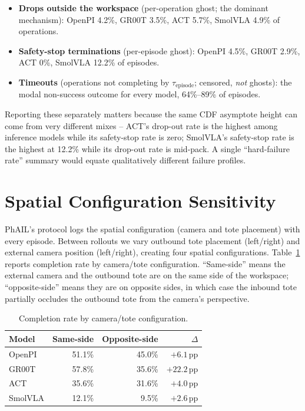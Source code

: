 \documentclass{article}
\begin{document}
\begin{itemize}
  \item \textbf{Drops outside the workspace} (per-operation ghost; the dominant mechanism): OpenPI 4.2\%, GR00T 3.5\%, ACT 5.7\%, SmolVLA 4.9\% of operations.
  \item \textbf{Safety-stop terminations} (per-episode ghost): OpenPI 4.5\%, GR00T 2.9\%, ACT 0\%, SmolVLA 12.2\% of episodes.
  \item \textbf{Timeouts} (operations not completing by $\tau_\text{episode}$; censored, \emph{not} ghosts): the modal non-success outcome for every model, 64\%--89\% of episodes.
\end{itemize}

Reporting these separately matters because the same CDF asymptote height can come from very different mixes -- ACT's drop-out rate is the highest among inference models while its safety-stop rate is zero; SmolVLA's safety-stop rate is the highest at 12.2\% while its drop-out rate is mid-pack. A single ``hard-failure rate'' summary would equate qualitatively different failure profiles.

\section{Spatial Configuration Sensitivity}\label{app:spatial}

PhAIL's protocol logs the spatial configuration (camera and tote placement) with every episode. Between rollouts we vary outbound tote placement (left/right) and external camera position (left/right), creating four spatial configurations. Table~\ref{tab:spatial} reports completion rate by camera/tote configuration. ``Same-side'' means the external camera and the outbound tote are on the same side of the workspace; ``opposite-side'' means they are on opposite sides, in which case the inbound tote partially occludes the outbound tote from the camera's perspective.

\begin{table}[!h]
\centering
\begin{tabular}{lrrr}
\toprule
Model & Same-side & Opposite-side & $\Delta$ \\
\midrule
OpenPI  & 51.1\% & 45.0\% & $+6.1$\,pp  \\
GR00T   & 57.8\% & 35.6\% & $+22.2$\,pp \\
ACT     & 35.6\% & 31.6\% & $+4.0$\,pp  \\
SmolVLA & 12.1\% & 9.5\%  & $+2.6$\,pp  \\
\bottomrule
\end{tabular}
\caption{Completion rate by camera/tote configuration.}
\label{tab:spatial}
\end{table}
\end{document}
